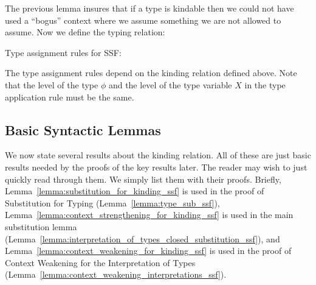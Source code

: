 \noindent
The previous lemma insures that if a type is kindable then we could
not have used a ``bogus'' context where we assume something we are not
allowed to assume.  Now we define the typing relation:
\begin{definition}
  \label{fig:typing_rules_ssf}
  Type assignment rules for SSF:
\end{definition}  
\noindent
The type assignment rules depend on the kinding relation defined
above.  Note that the level of the type $\phi$ and the level of the
type variable $X$ in the type application rule must be the same.

\subsection{Basic Syntactic Lemmas}
\label{subsec:basic_syntactic_lemmas}
We now state several results about the kinding relation. All of these
are just basic results needed by the proofs of the key results
later. The reader may wish to just quickly read through them.  We
simply list them with their proofs.  Briefly,
Lemma~\ref{lemma:substitution_for_kinding_ssf} is used in the proof of
Substitution for Typing (Lemma~\ref{lemma:type_sub_ssf}),
Lemma~\ref{lemma:context_strengthening_for_kinding_ssf} is used in the
main substitution lemma
(Lemma~\ref{lemma:interpretation_of_types_closed_substitution_ssf}),
and Lemma~\ref{lemma:context_weakening_for_kinding_ssf} is used in the
proof of Context Weakening for the Interpretation of Types
(Lemma~\ref{lemma:context_weakening_interpretations_ssf}).

